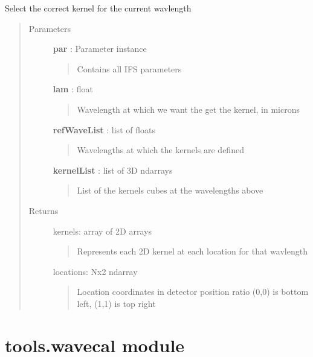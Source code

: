 \documentclass[letterpaper,10pt,english]{sphinxmanual}
\begin{document}
\begin{fulllineitems}
\label{tools:tools.spectrograph.selectKernel}
Select the correct kernel for the current wavlength
\begin{quote}\begin{description}
\item[{Parameters}] \leavevmode
\textbf{par} :   Parameter instance
\begin{quote}

Contains all IFS parameters
\end{quote}

\textbf{lam} : float
\begin{quote}

Wavelength at which we want the get the kernel, in microns
\end{quote}

\textbf{refWaveList} : list of floats
\begin{quote}

Wavelengths at which the kernels are defined
\end{quote}

\textbf{kernelList} : list of 3D ndarrays
\begin{quote}

List of the kernels cubes at the wavelengths above
\end{quote}

\item[{Returns}] \leavevmode
kernels: array of 2D arrays
\begin{quote}

Represents each 2D kernel at each location for that wavlength
\end{quote}

locations: Nx2 ndarray
\begin{quote}

Location coordinates in detector position ratio (0,0) is bottom left, (1,1) is
top right
\end{quote}

\end{description}\end{quote}

\end{fulllineitems}



\section{tools.wavecal module}
\label{tools:tools-wavecal-module}\label{tools:module-tools.wavecal}
\end{document}
